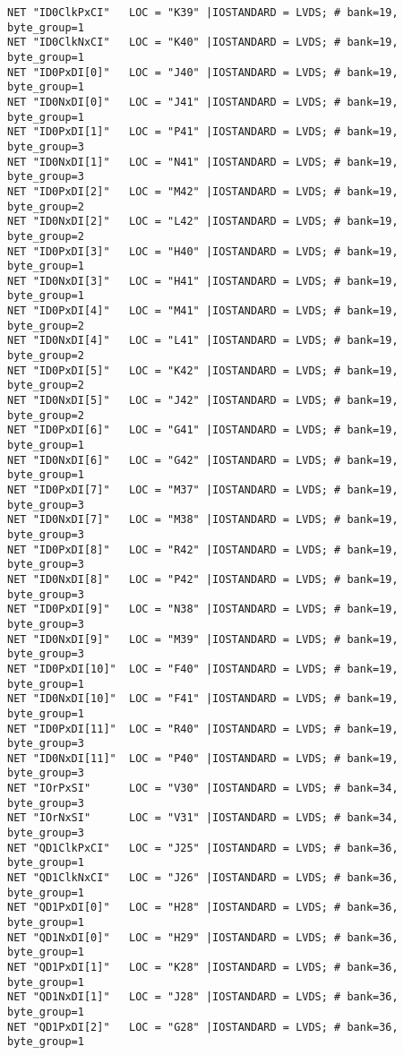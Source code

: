 \begin{appendix}
\begin{verbatim}
NET "ID0ClkPxCI"   LOC = "K39" |IOSTANDARD = LVDS; # bank=19, byte_group=1
NET "ID0ClkNxCI"   LOC = "K40" |IOSTANDARD = LVDS; # bank=19, byte_group=1
NET "ID0PxDI[0]"   LOC = "J40" |IOSTANDARD = LVDS; # bank=19, byte_group=1
NET "ID0NxDI[0]"   LOC = "J41" |IOSTANDARD = LVDS; # bank=19, byte_group=1
NET "ID0PxDI[1]"   LOC = "P41" |IOSTANDARD = LVDS; # bank=19, byte_group=3
NET "ID0NxDI[1]"   LOC = "N41" |IOSTANDARD = LVDS; # bank=19, byte_group=3
NET "ID0PxDI[2]"   LOC = "M42" |IOSTANDARD = LVDS; # bank=19, byte_group=2
NET "ID0NxDI[2]"   LOC = "L42" |IOSTANDARD = LVDS; # bank=19, byte_group=2
NET "ID0PxDI[3]"   LOC = "H40" |IOSTANDARD = LVDS; # bank=19, byte_group=1
NET "ID0NxDI[3]"   LOC = "H41" |IOSTANDARD = LVDS; # bank=19, byte_group=1
NET "ID0PxDI[4]"   LOC = "M41" |IOSTANDARD = LVDS; # bank=19, byte_group=2
NET "ID0NxDI[4]"   LOC = "L41" |IOSTANDARD = LVDS; # bank=19, byte_group=2
NET "ID0PxDI[5]"   LOC = "K42" |IOSTANDARD = LVDS; # bank=19, byte_group=2
NET "ID0NxDI[5]"   LOC = "J42" |IOSTANDARD = LVDS; # bank=19, byte_group=2
NET "ID0PxDI[6]"   LOC = "G41" |IOSTANDARD = LVDS; # bank=19, byte_group=1
NET "ID0NxDI[6]"   LOC = "G42" |IOSTANDARD = LVDS; # bank=19, byte_group=1
NET "ID0PxDI[7]"   LOC = "M37" |IOSTANDARD = LVDS; # bank=19, byte_group=3
NET "ID0NxDI[7]"   LOC = "M38" |IOSTANDARD = LVDS; # bank=19, byte_group=3
NET "ID0PxDI[8]"   LOC = "R42" |IOSTANDARD = LVDS; # bank=19, byte_group=3
NET "ID0NxDI[8]"   LOC = "P42" |IOSTANDARD = LVDS; # bank=19, byte_group=3
NET "ID0PxDI[9]"   LOC = "N38" |IOSTANDARD = LVDS; # bank=19, byte_group=3
NET "ID0NxDI[9]"   LOC = "M39" |IOSTANDARD = LVDS; # bank=19, byte_group=3
NET "ID0PxDI[10]"  LOC = "F40" |IOSTANDARD = LVDS; # bank=19, byte_group=1
NET "ID0NxDI[10]"  LOC = "F41" |IOSTANDARD = LVDS; # bank=19, byte_group=1
NET "ID0PxDI[11]"  LOC = "R40" |IOSTANDARD = LVDS; # bank=19, byte_group=3
NET "ID0NxDI[11]"  LOC = "P40" |IOSTANDARD = LVDS; # bank=19, byte_group=3
NET "IOrPxSI"      LOC = "V30" |IOSTANDARD = LVDS; # bank=34, byte_group=3
NET "IOrNxSI"      LOC = "V31" |IOSTANDARD = LVDS; # bank=34, byte_group=3
NET "QD1ClkPxCI"   LOC = "J25" |IOSTANDARD = LVDS; # bank=36, byte_group=1
NET "QD1ClkNxCI"   LOC = "J26" |IOSTANDARD = LVDS; # bank=36, byte_group=1
NET "QD1PxDI[0]"   LOC = "H28" |IOSTANDARD = LVDS; # bank=36, byte_group=1
NET "QD1NxDI[0]"   LOC = "H29" |IOSTANDARD = LVDS; # bank=36, byte_group=1
NET "QD1PxDI[1]"   LOC = "K28" |IOSTANDARD = LVDS; # bank=36, byte_group=1
NET "QD1NxDI[1]"   LOC = "J28" |IOSTANDARD = LVDS; # bank=36, byte_group=1
NET "QD1PxDI[2]"   LOC = "G28" |IOSTANDARD = LVDS; # bank=36, byte_group=1

\end{verbatim}
\end{appendix}
